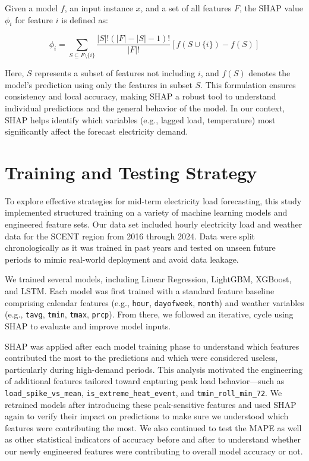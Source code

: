 \documentclass[final,numbered]{ifacconf}
\begin{document}
\begin{itemize}
Given a model \( f \), an input instance \( x \), and a set of all features \( F \), the SHAP value \( \phi_i \) for feature \( i \) is defined as:

\begin{equation}
\phi_i = \sum_{S \subseteq F \setminus \{i\}} \frac{|S|! (|F| - |S| - 1)!}{|F|!} \left[ f(S \cup \{i\}) - f(S) \right]
\end{equation}

Here, \( S \) represents a subset of features not including \( i \), and \( f(S) \) denotes the model's prediction using only the features in subset \( S \). This formulation ensures consistency and local accuracy, making SHAP a robust tool to understand individual predictions and the general behavior of the model. In our context, SHAP helps identify which variables (e.g., lagged load, temperature) most significantly affect the forecast electricity demand.
\end{itemize}

\section{Training and Testing Strategy}

To explore effective strategies for mid-term electricity load forecasting, this study implemented structured training on a variety of machine learning models and engineered feature sets. Our data set included hourly electricity load and weather data for the SCENT region from 2016 through 2024. Data were split chronologically as it was trained in past years and tested on unseen future periods to mimic real-world deployment and avoid data leakage.

We trained several models, including Linear Regression, LightGBM, XGBoost, and LSTM. Each model was first trained with a standard feature baseline comprising calendar features (e.g., \texttt{hour}, \texttt{dayofweek}, \texttt{month}) and weather variables (e.g., \texttt{tavg}, \texttt{tmin}, \texttt{tmax}, \texttt{prcp}). From there, we followed an iterative,  cycle using SHAP to evaluate and improve model inputs.

SHAP was applied after each model training phase to understand which features contributed the most to the predictions and which were considered useless, particularly during high-demand periods. This analysis motivated the engineering of additional features tailored toward capturing peak load behavior—such as \texttt{load\_spike\_vs\_mean}, \texttt{is\_extreme\_heat\_event}, and \texttt{tmin\_roll\_min\_72}. We retrained models after introducing these peak-sensitive features and used SHAP again to verify their impact on predictions to make sure we understood which features were contributing the most. We also continued to test the MAPE as well as other statistical indicators of accuracy before and after to understand whether our newly engineered features were contributing to overall model accuracy or not.
\end{document}
